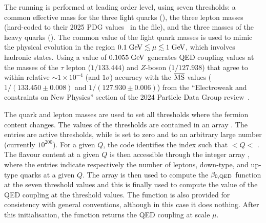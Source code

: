 The running is performed at leading order level, using seven
thresholds: a common effective mass for the three light quarks
(), the three lepton masses (hard-coded to their
2025 PDG values~\cite{ParticleDataGroup:2024cfk} in the
 file), and the three masses of the heavy
quarks ().
%
The common value of the light quark masses is used to mimic the
physical evolution in the region $0.1\;\mathrm{GeV} \lesssim \mu \lesssim
1\;\mathrm{GeV}$, which involves hadronic states.
%
Using a value of $0.1055\;\mathrm{GeV}$ generates QED coupling values at the
masses of the $\tau$ lepton ($1/133.444$) and $Z$-boson ($1/127.938$)
that agree to within relative $\sim 1\times 10^{-4}$ (and $1\sigma$) accuracy with the
$\overline{\mathrm{MS}}$ values ($1/(133.450 \pm 0.008)$ and $1/(127.930 \pm 0.006)$)
from the ``Electroweak and constraints on New Physics'' section of the
2024 Particle Data Group review~\cite{ParticleDataGroup:2024cfk}.

% 
%

The quark and lepton masses are used to set all thresholds where the
fermion content changes.
%
The values of the thresholds are contained in an array
.
%
The  entries are active thresholds, while
 is set to zero and  to an
arbitrary large number (currently $10^{200}$).
%
For a given $Q$, the code identifies the index  such that
$<Q<$ .
%
The flavour content at a given $Q$ is then accessible through the
integer array , where the
 entries indicate respectively the number of
leptons, down-type, and up-type quarks at a given $Q$.
%
%
The  array is then used to compute the
$\beta_{0,\rm QED}$ function  at the
seven threshold values and this is finally used to compute the value
of the QED coupling  at the
threshold values.
%
The function  is also provided for
consistency with general \hoppet conventions, although in this case it does nothing.
%
After this initialisation, the function  returns the QED coupling at
scale $\mu$.

